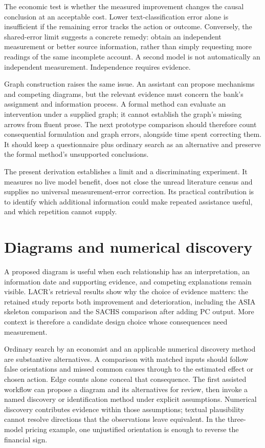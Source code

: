 The economic test is whether the measured improvement changes the causal
conclusion at an acceptable cost. Lower text-classification error alone is
insufficient if the remaining error tracks the action or outcome. Conversely,
the shared-error limit suggests a concrete remedy: obtain an independent
measurement or better source information, rather than simply requesting more
readings of the same incomplete account. A second model is not automatically
an independent measurement. Independence requires evidence.

Graph construction raises the same issue. An assistant can propose
mechanisms and competing diagrams, but the relevant evidence must concern
the bank's assignment and information process. A formal method can evaluate
an intervention under a supplied graph; it cannot establish the graph's
missing arrows from fluent prose. The next prototype comparison should
therefore count consequential formulation and graph errors, alongside time
spent correcting them. It should keep a questionnaire plus ordinary search
as an alternative and preserve the formal method's unsupported conclusions.

The present derivation establishes a limit and a discriminating experiment.
It measures no live model benefit, does not close the unread literature
census and supplies no universal measurement-error correction. Its practical
contribution is to identify which additional information could make repeated
assistance useful, and which repetition cannot supply.




\section{Diagrams and numerical discovery}
A proposed diagram is useful when each relationship has an interpretation,
an information date and supporting evidence, and competing explanations remain
visible. LACR's retrieval results show why the choice of evidence matters: the
retained study reports both improvement and deterioration, including the ASIA
skeleton comparison and the SACHS comparison after adding PC output. More
context is therefore a candidate design choice whose consequences need
measurement. \citep{v12_la_2402_15301}

Ordinary search by an economist and an applicable numerical discovery method
are substantive alternatives. A comparison with matched inputs should follow
false orientations and missed common causes through to the estimated effect
or chosen action. Edge counts alone conceal that consequence. The first
assisted workflow can propose a diagram and its alternatives for review, then
invoke a named discovery or identification method under explicit assumptions.
Numerical discovery contributes evidence within those assumptions; textual
plausibility cannot resolve directions that the observations leave equivalent.
In the three-model pricing example, one unjustified orientation is enough to
reverse the financial sign.



